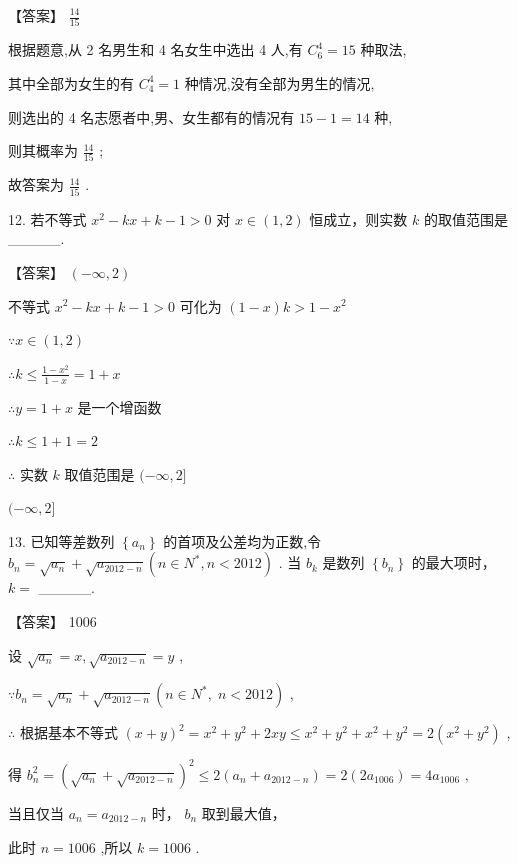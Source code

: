 \documentclass[10pt]{article}
\begin{document}
【答案】 \(\frac{14}{15}\)

根据题意,从 2 名男生和 4 名女生中选出 4 人,有 \({C}_{6}^{4} = {15}\) 种取法,

其中全部为女生的有 \({C}_{4}^{4} = 1\) 种情况,没有全部为男生的情况,

则选出的 4 名志愿者中,男、女生都有的情况有 \({15} - 1 = {14}\) 种,

则其概率为 \(\frac{14}{15}\) ;

故答案为 \(\frac{14}{15}\) .

12. 若不等式 \({x}^{2} - {kx} + k - 1 > 0\) 对 \(x \in  \left( {1,2}\right)\) 恒成立，则实数 \(k\) 的取值范围是\_\_\_\_\_.

【答案】 \(\left( {-\infty ,2}\right)\)

不等式 \({x}^{2} - {kx} + k - 1 > 0\) 可化为 \(\left( {1 - x}\right) k > 1 - {x}^{2}\)

\(\because x \in  \left( {1,2}\right)\)

\(\therefore k \leq  \frac{1 - {x}^{2}}{1 - x} = 1 + x\)

\(\therefore y = 1 + x\) 是一个增函数

\(\therefore k \leq  1 + 1 = 2\)

\(\therefore\) 实数 \(k\) 取值范围是 \(( - \infty ,2\rbrack\)

\(( - \infty ,2\rbrack\)

13. 已知等差数列 \(\left\{  {a}_{n}\right\}\) 的首项及公差均为正数,令 \({b}_{n} = \sqrt{{a}_{n}} + \sqrt{{a}_{{2012} - n}}\left( {n \in  {N}^{ * },n < {2012}}\right)\) . 当 \({b}_{k}\) 是数列 \(\left\{  {b}_{n}\right\}\) 的最大项时， \(k =\) \_\_\_\_\_.

【答案】 1006

设 \(\sqrt{{a}_{n}} = x,\sqrt{{a}_{{2012} - n}} = y\) ,

\(\because {b}_{n} = \sqrt{{a}_{n}} + \sqrt{{a}_{{2012} - n}}\left( {n \in  {N}^{ * },\;n < {2012}}\right)\) ,

\(\therefore\) 根据基本不等式 \({\left( x + y\right) }^{2} = {x}^{2} + {y}^{2} + {2xy} \leq  {x}^{2} + {y}^{2} + {x}^{2} + {y}^{2} = 2\left( {{x}^{2} + {y}^{2}}\right)\) ,

得 \({b}_{n}^{2} = {\left( \sqrt{{a}_{n}} + \sqrt{{a}_{{2012} - n}}\right) }^{2} \leq  2\left( {{a}_{n} + {a}_{{2012} - n}}\right)  = 2\left( {2{a}_{1006}}\right)  = 4{a}_{1006}\) ,

当且仅当 \({a}_{n} = {a}_{{2012} - n}\) 时， \({b}_{n}\) 取到最大值，

此时 \(n = {1006}\) ,所以 \(k = {1006}\) .
\end{document}
